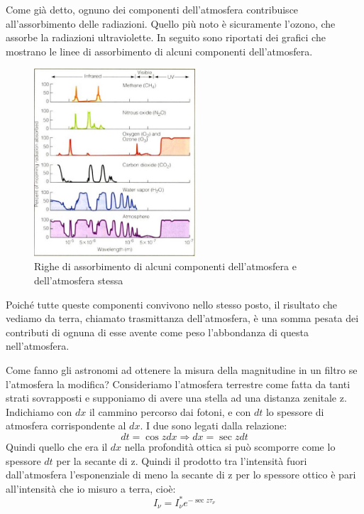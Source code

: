 \documentclass[a4paper,11pt]{article}
\begin{document}
    Come già detto, ognuno dei componenti dell'atmosfera contribuisce all'assorbimento delle radiazioni. Quello più noto è sicuramente l'ozono, che assorbe la radiazioni ultraviolette. In seguito sono riportati dei grafici che mostrano le linee di assorbimento di alcuni componenti dell'atmosfera.
    
    \begin{figure}[h!!]
        \centering
        \includegraphics[width=6cm]{righe ass atm.jpg}
        \caption{Righe di assorbimento di alcuni componenti dell'atmosfera e dell'atmosfera stessa}
        \label{fig:righe_ass_atm}
    \end{figure}
    
    Poiché tutte queste componenti convivono nello stesso posto, il risultato che vediamo da terra, chiamato trasmittanza dell'atmosfera, è una somma pesata dei contributi di ognuna di esse avente come peso l'abbondanza di questa nell'atmosfera. 
    
    Come fanno gli astronomi ad ottenere la misura della magnitudine in un filtro se l'atmosfera la modifica? Consideriamo l'atmosfera terrestre come fatta da tanti strati sovrapposti e supponiamo di avere una stella ad una distanza zenitale z. Indichiamo con $dx$ il cammino percorso dai fotoni, e con $dt$ lo spessore di atmosfera corrispondente al $dx$. I due sono legati dalla relazione:
    $$ 
        dt = \cos{z} dx \Rightarrow dx = \sec{z} dt 
    $$
    Quindi quello che era il $dx$ nella profondità ottica si può scomporre come lo spessore $dt$ per la secante di z. Quindi il prodotto tra l'intensità fuori dall'atmosfera l'esponenziale di meno la secante di z per lo spessore ottico è pari all'intensità che io misuro a terra, cioè:
    $$ 
        I_{\nu} = I_{\nu}^* e^{-\sec{z} \tau_{\nu}}
    $$
    
\end{document}
